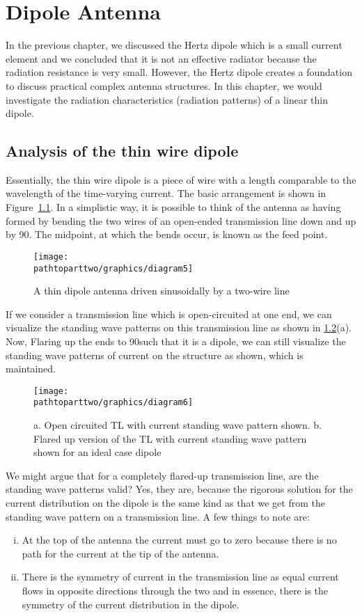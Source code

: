 \chapter{Dipole Antenna}\label{lec:lec50}
In the previous chapter, we discussed the Hertz dipole which is a small current element and we concluded that it is not an effective radiator because the radiation resistance is very small. However, the Hertz dipole creates a foundation to discuss practical complex antenna structures. In this chapter, we would investigate the radiation characteristics (radiation patterns) of a linear thin dipole.

\section{Analysis of the thin wire dipole}
Essentially, the thin wire dipole is a piece of wire with a length comparable to the wavelength of the time-varying current. The basic arrangement is shown in Figure~\ref{fig:thindipole}. In a simplistic way, it is possible to think of the antenna as having formed by bending the two wires of an open-ended transmission line down and up by 90\textdegree. The midpoint, at which the bends occur, is known as the feed point.
\begin{figure}[h]
\centering
\texttt{[image: \\pathtoparttwo/graphics/diagram5]}
\caption{A thin dipole antenna driven sinusoidally by a two-wire line}
\label{fig:thindipole}
\end{figure}

If we consider a transmission line which is open-circuited at one end, we can visualize the standing wave patterns on this transmission line as shown in \ref{fig:flaredtl}(a). Now, Flaring up the ends to 90\textdegree such that it is a dipole, we can still visualize the standing wave patterns of current on the structure as shown, which is maintained.
\begin{figure}[h]
\centering
\texttt{[image: \\pathtoparttwo/graphics/diagram6]}
\caption{a. Open circuited TL with current standing wave pattern shown.           
 b. Flared up version of the TL with current standing wave pattern shown for an ideal case dipole}
\label{fig:flaredtl}
\end{figure}

We might argue that for a completely flared-up transmission line, are the standing wave patterns valid? Yes, they are, because the rigorous solution for the current distribution on the dipole is the same kind as that we get from the standing wave pattern on a transmission line. A few things to note are:
\begin{enumerate}[(i)]
\item  At the top of the antenna the current must go to zero because there is no path for the current at the tip of the antenna.
\item  There is the symmetry of current in the transmission line as equal current flows in opposite directions through the two and in essence, there is the symmetry of the current distribution in the dipole. 
\end{enumerate}

